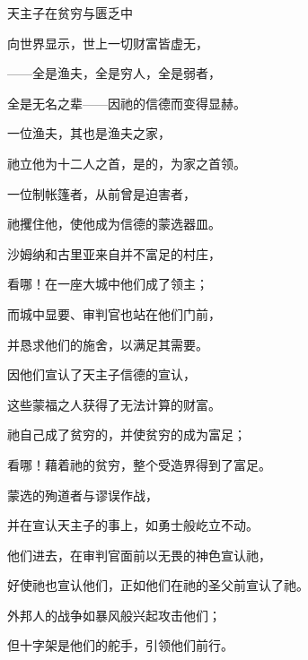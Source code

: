 天主子在贫穷与匮乏中\par

向世界显示，世上一切财富皆虚无，\par

——全是渔夫，全是穷人，全是弱者，\par

全是无名之辈——因祂的信德而变得显赫。\par

一位渔夫，其也是渔夫之家，\par

祂立他为十二人之首，是的，为家之首领。\par

一位制帐篷者，从前曾是迫害者，\par

祂攫住他，使他成为信德的蒙选器皿。\par

沙姆纳和古里亚来自并不富足的村庄，\par

看哪！在一座大城中他们成了领主；\par

而城中显要、审判官也站在他们门前，\par

并恳求他们的施舍，以满足其需要。\par

因他们宣认了天主子信德的宣认，\par

这些蒙福之人获得了无法计算的财富。\par

祂自己成了贫穷的，并使贫穷的成为富足；\par

看哪！藉着祂的贫穷，整个受造界得到了富足。\par

蒙选的殉道者与谬误作战，\par

并在宣认天主子的事上，如勇士般屹立不动。\par

他们进去，在审判官面前以无畏的神色宣认祂，\par

好使祂也宣认他们，正如他们在祂的圣父前宣认了祂。\par

外邦人的战争如暴风般兴起攻击他们；\par

但十字架是他们的舵手，引领他们前行。\par

